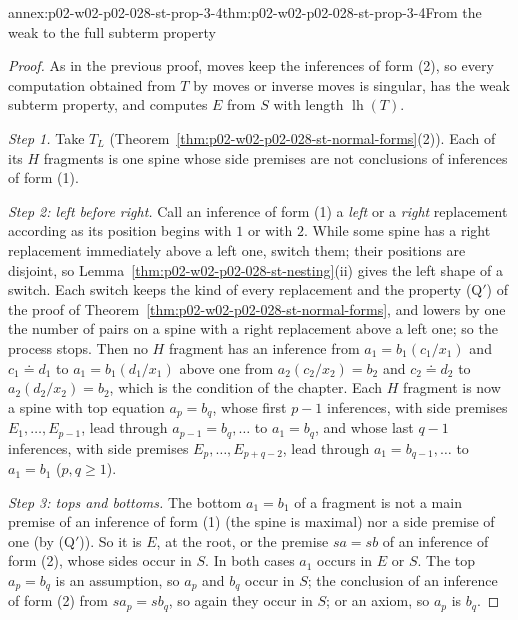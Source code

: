 \begin{annexitem}{annex:p02-w02-p02-028-st-prop-3-4}{thm:p02-w02-p02-028-st-prop-3-4}{From the weak to the full subterm property}
\begin{proof}
As in the previous proof, moves keep the inferences of form (2), so every
computation obtained from \(T\) by moves or inverse moves is singular, has
the weak subterm property, and computes \(E\) from \(S\) with length
\(\operatorname{lh}(T)\).

\emph{Step 1.}  Take \(T_L\)
(Theorem~\ref{thm:p02-w02-p02-028-st-normal-forms}(2)).  Each of its \(H\)
fragments is one spine whose side premises are not conclusions of
inferences of form (1).

\emph{Step 2: left before right.}  Call an inference of form (1) a
\emph{left} or a \emph{right} replacement according as its position begins
with \(1\) or with \(2\).  While some spine has a right replacement
immediately above a left one, switch them; their positions are disjoint, so
Lemma~\ref{thm:p02-w02-p02-028-st-nesting}(ii) gives the left shape of a
switch.  Each switch keeps the kind of every replacement and the property
(Q\('\)) of the proof of
Theorem~\ref{thm:p02-w02-p02-028-st-normal-forms}, and lowers by one the
number of pairs on a spine with a right replacement above a left one; so the
process stops.  Then no \(H\) fragment has an inference from
\(a_1=b_1(c_1/x_1)\) and \(c_1\doteq d_1\) to \(a_1=b_1(d_1/x_1)\) above one
from \(a_2(c_2/x_2)=b_2\) and \(c_2\doteq d_2\) to \(a_2(d_2/x_2)=b_2\), which
is the condition of the chapter.  Each \(H\) fragment is now a spine with top
equation \(a_p=b_q\), whose first \(p-1\) inferences, with side premises
\(E_1,\ldots,E_{p-1}\), lead through \(a_{p-1}=b_q,\ldots\) to \(a_1=b_q\), and
whose last \(q-1\) inferences, with side premises
\(E_p,\ldots,E_{p+q-2}\), lead through \(a_1=b_{q-1},\ldots\) to \(a_1=b_1\)
(\(p,q\geq1\)).

\emph{Step 3: tops and bottoms.}  The bottom \(a_1=b_1\) of a fragment is
not a main premise of an inference of form (1) (the spine is maximal) nor a
side premise of one (by (Q\('\))).  So it is \(E\), at the root, or the
premise \(sa=sb\) of an inference of form (2), whose sides occur in \(S\).
In both cases \(a_1\) occurs in \(E\) or \(S\).  The top \(a_p=b_q\) is an
assumption, so \(a_p\) and \(b_q\) occur in \(S\); the conclusion of an
inference of form (2) from \(sa_p=sb_q\), so again they occur in \(S\); or an
axiom, so \(a_p\) is \(b_q\).


\end{proof}
\end{annexitem}
